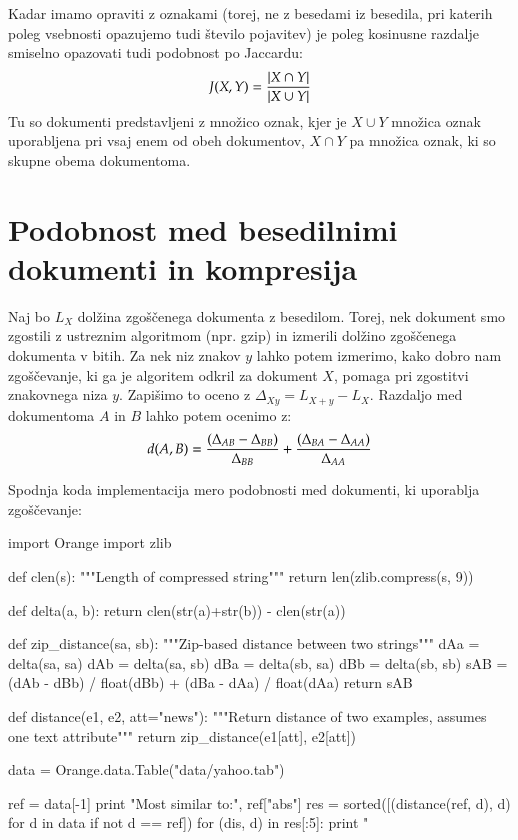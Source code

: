 Kadar imamo opraviti z oznakami (torej, ne z besedami iz besedila, pri
katerih poleg vsebnosti opazujemo tudi število pojavitev) je poleg
kosinusne razdalje smiselno opazovati tudi podobnost po Jaccardu:
%
$$J(X,Y) = {{|X \cap Y|}\over{|X \cup Y|}}$$
%
Tu so dokumenti predstavljeni z množico oznak, kjer je $X \cup Y$
množica oznak uporabljena pri vsaj enem od obeh dokumentov, $X \cap Y$
pa množica oznak, ki so skupne obema dokumentoma.

\iffalse
\section{Podobnost med besedilnimi dokumenti in kompresija}

%
%

Naj bo $L_X$ dolžina zgoščenega dokumenta z besedilom. Torej, nek
dokument smo zgostili z ustreznim algoritmom (npr. gzip) in izmerili
dolžino zgoščenega dokumenta v bitih. Za nek niz znakov $y$ lahko
potem izmerimo, kako dobro nam zgoščevanje, ki ga je algoritem odkril
za dokument $X$, pomaga pri zgostitvi znakovnega niza $y$. Zapišimo to
oceno z $\Delta_{Xy}=L_{X+y}-L_{X}$. Razdaljo med dokumentoma $A$ in
$B$ lahko potem ocenimo z:
%
$$d(A,B) = {(\Delta_{AB}-\Delta_{BB}) \over \Delta_{BB}} +
{(\Delta_{BA}-\Delta_{AA}) \over \Delta_{AA}}$$

Spodnja koda implementacija mero podobnosti med dokumenti, ki
uporablja zgoščevanje:

\begin{python}
import Orange
import zlib

def clen(s):
    """Length of compressed string"""
    return len(zlib.compress(s, 9))

def delta(a, b):
    return clen(str(a)+str(b)) - clen(str(a))

def zip_distance(sa, sb):
    """Zip-based distance between two strings"""
    dAa = delta(sa, sa)
    dAb = delta(sa, sb)
    dBa = delta(sb, sa)
    dBb = delta(sb, sb)
    sAB = (dAb - dBb) / float(dBb) + (dBa - dAa) / float(dAa)
    return sAB

def distance(e1, e2, att="news"):
    """Return distance of two examples, assumes one text attribute"""
    return zip_distance(e1[att], e2[att])

data = Orange.data.Table("data/yahoo.tab")

ref = data[-1]
print "Most similar to:", ref["abs"]
res = sorted([(distance(ref, d), d) for d in data if not d == ref])
for (dis, d) in res[:5]:
    print "%
\end{python}

